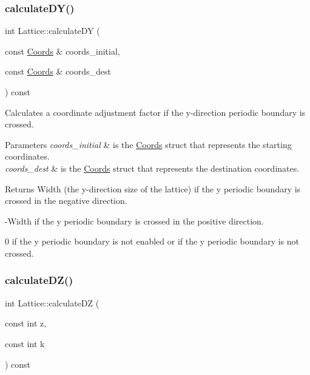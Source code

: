 \subsubsection{\texorpdfstring{calculate\+D\+Y()}{calculateDY()}\hspace{0.1cm}{\footnotesize\ttfamily [2/2]}}
{\footnotesize\ttfamily int Lattice\+::calculate\+DY (\begin{DoxyParamCaption}\item[{const \hyperlink{struct_coords}{Coords} \&}]{coords\+\_\+initial,  }\item[{const \hyperlink{struct_coords}{Coords} \&}]{coords\+\_\+dest }\end{DoxyParamCaption}) const}



Calculates a coordinate adjustment factor if the y-\/direction periodic boundary is crossed. 


\begin{DoxyParams}{Parameters}
{\em coords\+\_\+initial} & is the \hyperlink{struct_coords}{Coords} struct that represents the starting coordinates. \\
\hline
{\em coords\+\_\+dest} & is the \hyperlink{struct_coords}{Coords} struct that represents the destination coordinates. \\
\hline
\end{DoxyParams}
\begin{DoxyReturn}{Returns}
Width (the y-\/direction size of the lattice) if the y periodic boundary is crossed in the negative direction. 

-\/\+Width if the y periodic boundary is crossed in the positive direction. 

0 if the y periodic boundary is not enabled or if the y periodic boundary is not crossed. 
\end{DoxyReturn}
\mbox{\label{class_lattice_a584ff9c528ebe46a6aea6ed652d107f4}} 
\subsubsection{\texorpdfstring{calculate\+D\+Z()}{calculateDZ()}\hspace{0.1cm}{\footnotesize\ttfamily [1/2]}}
{\footnotesize\ttfamily int Lattice\+::calculate\+DZ (\begin{DoxyParamCaption}\item[{const int}]{z,  }\item[{const int}]{k }\end{DoxyParamCaption}) const}



